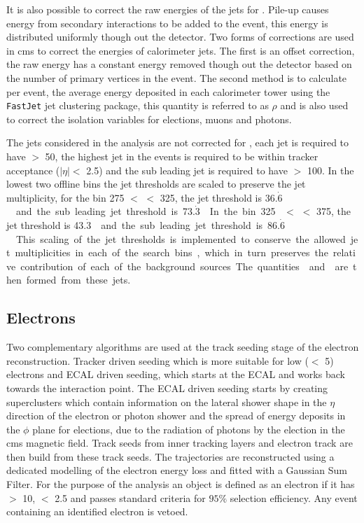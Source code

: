 It is also possible to correct the raw energies of the jets for \pu. Pile-up 
causes energy from secondary interactions to be added to the event, this 
energy is distributed uniformly though out the detector. Two forms of \pu 
corrections are used in \ac{cms} to correct the energies of calorimeter jets. 
The first is an offset correction, the raw energy has a constant energy removed 
though out the detector based on the number of primary vertices in the event. 
The second method is to calculate per event, the average energy deposited in 
each calorimeter tower using the 
\texttt{FastJet}\cite{Cacciari:2011ma,hep-ph/0512210} jet clustering package, 
this quantity is referred to as $\rho$ and is also used to correct the 
isolation variables for elections, muons and photons.


The jets considered in the analysis are not corrected for \pu, each jet is 
required to have \ET $>$ \unit{50}{\GeV}, the highest \ET jet in the events is 
required to be within tracker acceptance ($|\eta| <$ 2.5) and the sub leading 
jet is required to have \ET $>$ \unit{100}{\GeV}. In the lowest two offline \HT 
bins the jet thresholds are scaled to preserve the jet multiplicity, for the 
bin \unit{275}{\GeV} $<$ \HT $<$ \unit{325}{\GeV}, the jet threshold is 
\unit{36.$\dot{6}$}{\GeV} and the sub leading jet threshold is 
\unit{73.$\dot{3}$}{\GeV}. In the bin \unit{325}{\GeV} $<$ \HT $<$ 
\unit{375}{\GeV}, the jet threshold is \unit{43.$\dot{3}$}{\GeV} and the sub 
leading jet threshold is \unit{86.$\dot{6}$}{\GeV}. This scaling of the jet 
thresholds is implemented to conserve the allowed jet multiplicities in each of 
the search bins, which in turn preserves the relative contribution of each of 
the background sources.

The quantities \HT and \HTm are then formed from these jets.

\subsection{Electrons} %
\label{sub:electrons}
Two complementary algorithms are used at the track seeding stage of the 
electron reconstruction. Tracker driven seeding which is more suitable for low 
\PT (\PT $<$ \unit{5}{\GeV}) electrons and ECAL driven seeding, which starts at 
the ECAL and works back towards the interaction point. The ECAL driven seeding 
starts by creating superclusters\cite{0954-3899-34-6-S01} which contain 
information on the lateral shower shape in the $\eta$ direction of the electron 
or photon shower and the spread of energy deposits in the $\phi$ plane for 
elections, due to the radiation of photons by the election in the \ac{cms} 
magnetic field. Track seeds from inner tracking layers and electron track are 
then build from these track seeds. The trajectories are reconstructed using a 
dedicated modelling of the electron energy loss and fitted with a Gaussian Sum 
Filter\cite{0954-3899-31-9-N01}.
For the purpose of the analysis an object is defined as an electron if it has 
\PT $>$ \unit{10}{\GeV}, \mETA $<$ 2.5 and passes standard criteria for $95\%$ selection efficiency\cite{PAS-EGM-10-004}. Any event containing an identified 
electron is vetoed. 

